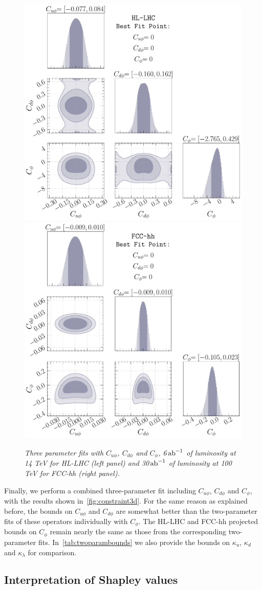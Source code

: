 \begin{figure}[t!]
	\centering
	\includegraphics[width =0.47\linewidth]{fig/kappa_u-kappa_d-kappa_l-HL-LHC.pdf}
	\includegraphics[width =0.47\linewidth]{fig/kappa_u-kappa_d-kappa_l-FCC-hh.pdf}
	\caption{\it Three parameter fits with $C_{u\phi}$, $C_{d\phi}$ and $C_\phi$, 6$\,{\rm ab}^{-1}$ of luminosity at 14 TeV for HL-LHC (left panel) and 30$\,{\rm ab}^{-1}$ of luminosity at 100 TeV for FCC-hh (right panel).}
	\label{fig:constraint3d}
\end{figure}

Finally, we perform a combined three-parameter fit including $C_{u\phi}$, $C_{d\phi}$ and $C_\phi$, with the results shown in~\autoref{fig:constraint3d}. For the same reason as explained before, the bounds on $C_{u\phi}$ and $C_{d\phi}$ are somewhat better than the two-parameter fits of these operators individually with $C_\phi$. The HL-LHC and FCC-hh projected bounds on $C_\phi$ remain nearly the same as those from the corresponding two-parameter fits. In~\autoref{tab:twoparambounds} we also provide the bounds on $\kappa_u$, $\kappa_d$ and $\kappa_\lambda$ for comparison.

\subsection{Interpretation of Shapley values}
\label{sec:multiparam}

